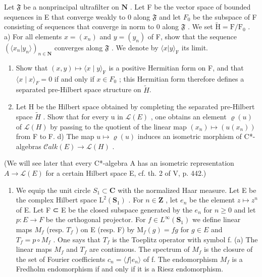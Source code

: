   Let \(\mathfrak{F}\) be a nonprincipal ultrafilter on \(\mathbf{N}\) . Let F be the vector space of bounded sequences in E that converge weakly to 0 along \(\mathfrak{F}\) and let \(F_0\) be the subspace of F consisting of sequences that converge in norm to 0 along \(\mathfrak{F}\) . We set \(\widetilde{\mathrm{H}} = \mathrm{F} / \mathrm{F}_0\) . a) For all elements \(x = (x_n)\) and \(y = (y_n)\) of F, show that the sequence \((\langle x_n | y_n \rangle)_{n \in \mathbf{N}}\) converges along \(\mathfrak{F}\) . We denote by \(\langle x | y \rangle_{\mathrm{F}}\) its limit.

\begin{enumerate}
\def\labelenumi{\alph{enumi})}
\setcounter{enumi}{1}
\item
  Show that \((x,y)\mapsto\langle x\mid y\rangle_{\mathrm{F}}\) is a positive Hermitian form on F, and that \(\langle x\mid x\rangle_{F}=0\) if and only if \(x\in F_{0}\) ; this Hermitian form therefore defines a separated pre-Hilbert space structure on \(\widetilde{H}\).
\item
  Let H be the Hilbert space obtained by completing the separated pre-Hilbert space \(\widetilde{H}\) . Show that for every u in \(\mathcal{L}(E)\) , one obtains an element \(\varrho(u)\) of \(\mathcal{L}(H)\) by passing to the quotient of the linear map \((x_{n})\mapsto(u(x_{n}))\) from F to F. d) The map \(u\mapsto\varrho(u)\) induces an isometric morphism of C*-algebras \(\mathcal{C}alk(E)\to\mathcal{L}(H)\) .
\end{enumerate}

(We will see later that every C*-algebra A has an isometric representation \(A \to \mathcal{L}(E)\) for a certain Hilbert space E, cf. th. 2 of V, p. 442.)

\begin{enumerate}
\def\labelenumi{\arabic{enumi})}
\setcounter{enumi}{6}
\tightlist
\item
  We equip the unit circle \(S_{1} \subset \mathbf{C}\) with the normalized Haar measure. Let E be the complex Hilbert space \(\mathrm{L}^{2}(\mathbf{S}_{1})\) . For \(n \in \mathbf{Z}\) , let \(e_{n}\) be the element \(z \mapsto z^{n}\) of E. Let F ⊂ E be the closed subspace generated by the \(e_{n}\) for \(n \geqslant 0\) and let \(p: E \to F\) be the orthogonal projector. For \(f \in L^{\infty}(\mathbf{S}_{1})\) we define linear maps \(M_{f}\) (resp. \(T_{f}\) ) on E (resp. F) by \(\mathrm{M}_{f}(g) = fg\) for \(g \in E\) and \(T_{f} = p \circ M_{f}\) . One says that \(T_{f}\) is the Toeplitz operator with symbol f. (a) The linear maps \(M_{f}\) and \(T_{f}\) are continuous. The spectrum of \(M_{f}\) is the closure of the set of Fourier coefficients \(c_{n} = \langle f | e_{n} \rangle\) of f. The endomorphism \(M_{f}\) is a Fredholm endomorphism if and only if it is a Riesz endomorphism.
\end{enumerate}

